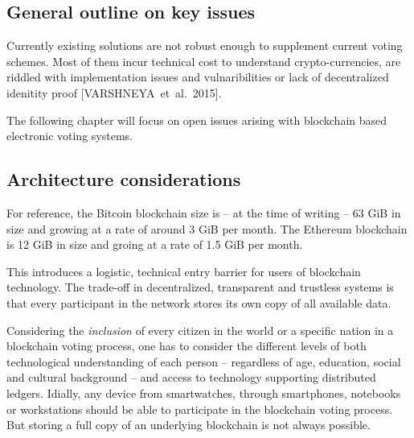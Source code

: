\documentclass[9pt,oneside]{amsart}
\begin{document}
\begin{multicols}{2}
\section{General outline on key issues}
Currently existing solutions are not robust enough to supplement current voting schemes. Most of them incur technical cost to understand crypto-currencies, are riddled with implementation issues and vulnaribilities or lack of decentralized idenitity proof [VARSHNEYA~et~al.~2015].\par
The following chapter will focus on open issues arising with blockchain based electronic voting systems.

\subsection{Architecture considerations}
For reference, the Bitcoin blockchain size is -- at the time of writing -- 63 GiB in size and growing at a rate of around 3 GiB per month. The Ethereum blockchain is 12 GiB in size and groing at a rate of 1.5 GiB per month.\par
This introduces a logistic, technical entry barrier for users of blockchain technology. The trade-off in decentralized, transparent and trustless systems is that every participant in the network stores its own copy of all available data.\par
Considering the \textit{inclusion} of every citizen in the world or a specific nation in a blockchain voting process, one has to consider the different levels of both technological understanding of each person -- regardless of age, education, social and cultural background -- and access to technology supporting distributed ledgers. Idially, any device from smartwatches, through smartphones, notebooks or workstations should be able to participate in the blockchain voting process. But storing a full copy of an underlying blockchain is not always possible.

\end{multicols}
\end{document}

